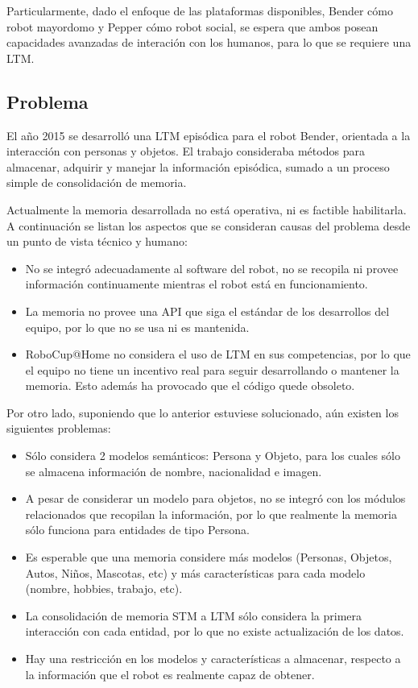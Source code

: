 Particularmente, dado el enfoque de las plataformas disponibles, Bender c\'omo robot mayordomo y Pepper c\'omo robot social, se espera que ambos posean capacidades avanzadas de interaci\'on con los humanos, para lo que se requiere una LTM.


\subsection{Problema}

El a\~no 2015 se desarroll\'o una LTM epis\'odica para el robot Bender, orientada a la interacci\'on con personas y objetos\cite{Sanchez:2015}. El trabajo consideraba m\'etodos para almacenar, adquirir y manejar la informaci\'on epis\'odica, sumado a un proceso simple de consolidaci\'on de memoria.

Actualmente la memoria desarrollada no est\'a operativa, ni es factible habilitarla. A continuaci\'on se listan los aspectos que se consideran causas del problema desde un punto de vista t\'ecnico y humano:
\begin{itemize}
\item No se integr\'o adecuadamente al software del robot, no se recopila ni provee informaci\'on continuamente mientras el robot est\'a en funcionamiento.
\item La memoria no provee una API que siga el est\'andar de los desarrollos del equipo, por lo que no se usa ni es mantenida.
\item RoboCup@Home no considera el uso de LTM en sus competencias, por lo que el equipo no tiene un incentivo real para seguir desarrollando o mantener la memoria. Esto adem\'as ha provocado que el c\'odigo quede obsoleto.
\end{itemize}

Por otro lado, suponiendo que lo anterior estuviese solucionado, a\'un existen los siguientes problemas:
\begin{itemize}
\item S\'olo considera 2 modelos sem\'anticos: Persona y Objeto, para los cuales s\'olo se almacena informaci\'on de nombre, nacionalidad e imagen.
\item A pesar de considerar un modelo para objetos, no se integr\'o con los m\'odulos relacionados que recopilan la informaci\'on, por lo que realmente la memoria s\'olo funciona para entidades de tipo Persona.
\item Es esperable que una memoria considere m\'as modelos (Personas, Objetos, Autos, Ni\~nos, Mascotas, etc) y m\'as caracter\'isticas para cada modelo (nombre, hobbies, trabajo, etc).
\item La consolidaci\'on de memoria STM a LTM s\'olo considera la primera interacci\'on con cada entidad, por lo que no existe actualizaci\'on de los datos.
\item Hay una restricci\'on en los modelos y caracter\'isticas a almacenar, respecto a la informaci\'on que el robot es realmente capaz de obtener.
\end{itemize}


